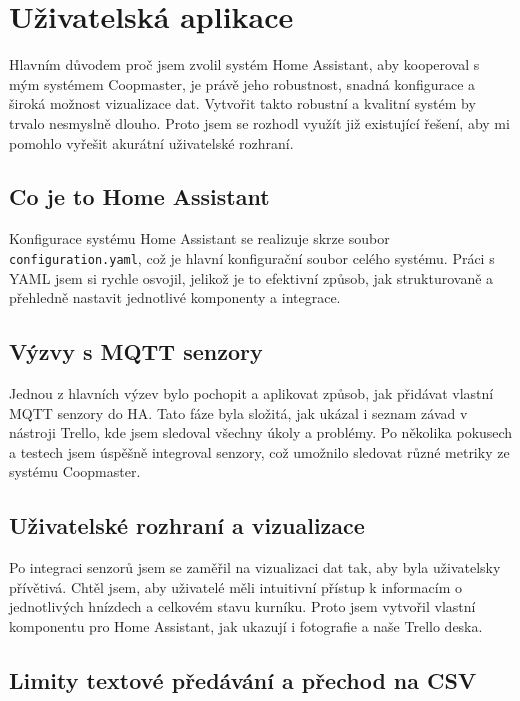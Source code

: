 \section{Uživatelská aplikace}\label{sec:tvorba-gui-rozhrani}
Hlavním důvodem proč jsem zvolil systém Home Assistant, aby kooperoval s mým systémem Coopmaster, je právě jeho robustnost, snadná konfigurace a široká možnost vizualizace dat.
Vytvořit takto robustní a kvalitní systém by trvalo nesmyslně dlouho.
Proto jsem se rozhodl využít již existující řešení, aby mi pomohlo vyřešit akurátní uživatelské rozhraní. \newline

\subsection*{Co je to Home Assistant}
Konfigurace systému Home Assistant se realizuje skrze soubor \texttt{configuration.yaml}, což je hlavní konfigurační soubor celého systému.
Práci s YAML jsem si rychle osvojil, jelikož je to efektivní způsob, jak strukturovaně a přehledně nastavit jednotlivé komponenty a integrace.

\subsection*{Výzvy s MQTT senzory}

Jednou z hlavních výzev bylo pochopit a aplikovat způsob, jak přidávat vlastní MQTT senzory do HA. Tato fáze byla složitá, jak ukázal i seznam závad v nástroji Trello, kde jsem sledoval všechny úkoly a problémy.
Po několika pokusech a testech jsem úspěšně integroval senzory, což umožnilo sledovat různé metriky ze systému Coopmaster.

\subsection*{Uživatelské rozhraní a vizualizace}

Po integraci senzorů jsem se zaměřil na vizualizaci dat tak, aby byla uživatelsky přívětivá.
Chtěl jsem, aby uživatelé měli intuitivní přístup k informacím o jednotlivých hnízdech a celkovém stavu kurníku.
Proto jsem vytvořil vlastní komponentu pro Home Assistant, jak ukazují i fotografie a naše Trello deska.

\subsection*{Limity textové předávání a přechod na CSV}

